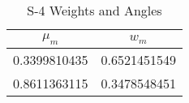 
\begin{table}[h!]
    \caption{S-4 Weights and Angles}
    \label{tb:s4quad}
    \centering
    \begin{tabular}{cc}
        \toprule
        $\mu_m$ & $w_m$ \\
        \midrule
        0.3399810435 & 0.6521451549 \\
        0.8611363115 & 0.3478548451 \\
        \bottomrule
    \end{tabular}
\end{table}